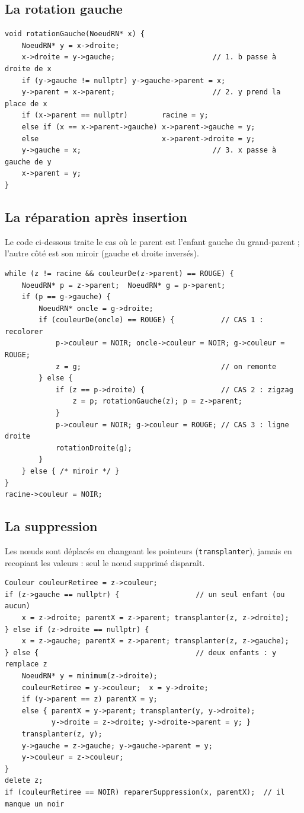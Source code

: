 \documentclass[12pt,a4paper]{report}
\begin{document}
\subsection{La rotation gauche}
\begin{lstlisting}
void rotationGauche(NoeudRN* x) {
    NoeudRN* y = x->droite;
    x->droite = y->gauche;                       // 1. b passe à droite de x
    if (y->gauche != nullptr) y->gauche->parent = x;
    y->parent = x->parent;                       // 2. y prend la place de x
    if (x->parent == nullptr)        racine = y;
    else if (x == x->parent->gauche) x->parent->gauche = y;
    else                             x->parent->droite = y;
    y->gauche = x;                               // 3. x passe à gauche de y
    x->parent = y;
}
\end{lstlisting}

\subsection{La réparation après insertion}
Le code ci-dessous traite le cas où le parent est l'enfant gauche du grand-parent ; l'autre côté est son miroir (gauche et droite inversés).
\begin{lstlisting}
while (z != racine && couleurDe(z->parent) == ROUGE) {
    NoeudRN* p = z->parent;  NoeudRN* g = p->parent;
    if (p == g->gauche) {
        NoeudRN* oncle = g->droite;
        if (couleurDe(oncle) == ROUGE) {           // CAS 1 : recolorer
            p->couleur = NOIR; oncle->couleur = NOIR; g->couleur = ROUGE;
            z = g;                                 // on remonte
        } else {
            if (z == p->droite) {                  // CAS 2 : zigzag
                z = p; rotationGauche(z); p = z->parent;
            }
            p->couleur = NOIR; g->couleur = ROUGE; // CAS 3 : ligne droite
            rotationDroite(g);
        }
    } else { /* miroir */ }
}
racine->couleur = NOIR;
\end{lstlisting}

\subsection{La suppression}
Les nœuds sont déplacés en changeant les pointeurs (\texttt{transplanter}), jamais en recopiant les valeurs : seul le nœud supprimé disparaît.
\begin{lstlisting}
Couleur couleurRetiree = z->couleur;
if (z->gauche == nullptr) {                  // un seul enfant (ou aucun)
    x = z->droite; parentX = z->parent; transplanter(z, z->droite);
} else if (z->droite == nullptr) {
    x = z->gauche; parentX = z->parent; transplanter(z, z->gauche);
} else {                                     // deux enfants : y remplace z
    NoeudRN* y = minimum(z->droite);
    couleurRetiree = y->couleur;  x = y->droite;
    if (y->parent == z) parentX = y;
    else { parentX = y->parent; transplanter(y, y->droite);
           y->droite = z->droite; y->droite->parent = y; }
    transplanter(z, y);
    y->gauche = z->gauche; y->gauche->parent = y;
    y->couleur = z->couleur;
}
delete z;
if (couleurRetiree == NOIR) reparerSuppression(x, parentX);  // il manque un noir
\end{lstlisting}
\end{document}
